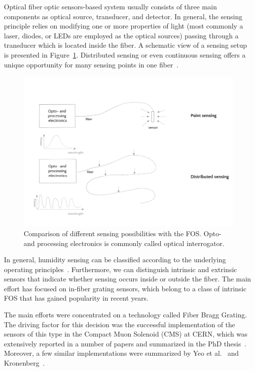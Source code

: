 Optical fiber optic sensors-based system usually consists of three main components as optical source, transducer, and detector. In general, the sensing principle relies on modifying one or more properties of light (most commonly a laser, diodes, or LEDs are employed as the optical sources) passing through a transducer which is located inside the fiber. A schematic view of a sensing setup is presented in Figure~\ref{fig:sensing}. Distributed sensing or even continuous sensing offers a unique opportunity for many sensing points in one fiber~\cite{GRATTAN200040}. 
\newpage
\begin{figure}[!h]
\centering
\includegraphics[width=0.95\columnwidth]{Chapter5/images/sensing.png}
\caption{Comparison of different sensing possibilities with the \gls{FOS}. Opto- and processing electronics is commonly called optical interrogator.}
\label{fig:sensing}
\end{figure}

In general, humidity sensing can be classified according to the underlying operating principles~\cite{fos_overview}. Furthermore, we can distinguish intrinsic and extrinsic sensors that indicate whether sensing occurs inside or outside the fiber. The main effort has focused on in-fiber grating sensors, which belong to a class of intrinsic \gls{FOS} that has gained popularity in recent years. 

The main efforts were concentrated on a technology called Fiber Bragg Grating. The driving factor for this decision was the successful implementation of the sensors of this type in the Compact Muon Solenoid (\gls{CMS}) at \gls{CERN}, which was extensively reported in a number of papers and summarized in the PhD thesis~\cite{Berruti}. Moreover, a few similar implementations were summarized by Yeo et al.~\cite{YEO_PI} and Kronenberg~\cite{Kronenberg:02}. 


